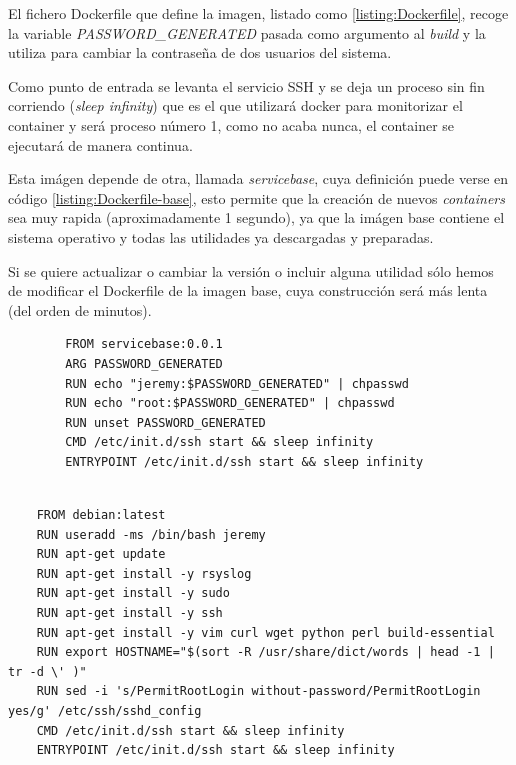 El fichero Dockerfile que define la imagen, listado como \ref{listing:Dockerfile}, recoge la variable 
\emph{PASSWORD\_GENERATED} pasada como argumento al \emph{build} y la utiliza para cambiar la contraseña
de dos usuarios del sistema. 

Como punto de entrada se levanta el servicio SSH y se deja un proceso sin fin
corriendo (\emph{sleep infinity}) que es el que utilizará docker para monitorizar el container y será proceso
número 1, como no acaba nunca, el container se ejecutará de manera continua. 

Esta imágen depende de otra, llamada \emph{servicebase}, cuya definición puede verse en código \ref{listing:Dockerfile-base}, 
esto permite que la creación de nuevos \emph{containers} sea muy rapida (aproximadamente 1 segundo), ya que 
la imágen base contiene el sistema operativo y todas las utilidades ya descargadas y preparadas.

Si se quiere actualizar o cambiar la versión o incluir alguna utilidad sólo hemos de modificar el Dockerfile
de la imagen base, cuya construcción será más lenta (del orden de minutos).

    \begin{verbatim}
        FROM servicebase:0.0.1
        ARG PASSWORD_GENERATED
        RUN echo "jeremy:$PASSWORD_GENERATED" | chpasswd
        RUN echo "root:$PASSWORD_GENERATED" | chpasswd
        RUN unset PASSWORD_GENERATED
        CMD /etc/init.d/ssh start && sleep infinity
        ENTRYPOINT /etc/init.d/ssh start && sleep infinity
        
    \end{verbatim}
    


\begin{verbatim}
    FROM debian:latest
    RUN useradd -ms /bin/bash jeremy
    RUN apt-get update
    RUN apt-get install -y rsyslog
    RUN apt-get install -y sudo
    RUN apt-get install -y ssh
    RUN apt-get install -y vim curl wget python perl build-essential
    RUN export HOSTNAME="$(sort -R /usr/share/dict/words | head -1 | tr -d \' )"
    RUN sed -i 's/PermitRootLogin without-password/PermitRootLogin yes/g' /etc/ssh/sshd_config
    CMD /etc/init.d/ssh start && sleep infinity
    ENTRYPOINT /etc/init.d/ssh start && sleep infinity
\end{verbatim}




